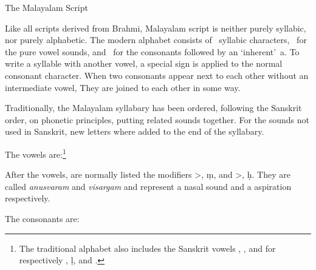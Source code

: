 \beginsection The Malayalam Script

Like all scripts derived from Brahmi, Malayalam script is neither 
purely syllabic, nor purely alphabetic. The modern alphabet consists 
of {}~syllabic characters, {}~for the pure vowel sounds, and 
{}~for the consonants followed by an `inherent'~{\mmtr a}. To write a 
syllable with another vowel, a special sign is applied to the normal 
consonant character. When two consonants appear next to each other 
without an intermediate vowel, They are joined to each other in some 
way.

Traditionally, the Malayalam syllabary has been ordered, following the 
Sanskrit order, on phonetic principles, putting related sounds 
together. For the sounds not used in Sanskrit, new letters where added 
to the end of the syllabary.

\noindent The vowels are:\footnote*{The traditional alphabet also 
includes the Sanskrit vowels {\mm {}}, {\mm {}}, and {\mm {}} for respectively 
{\mmtr {\rii}}, {\mmtr \d l}, and {\mmtr {\lii}}.}

\bigskip
\centerline{\vbox{\twelvemmc{}}}
\bigskip

\noindent After the vowels, are normally listed the modifiers {\mm {}>}, 
{\mmtr \d m}, and {\mm {}>}, {\mmtr \d h}. They are called {\it anusvaram} and {\it 
visargam} and represent a nasal sound and a aspiration respectively.

The consonants are:


